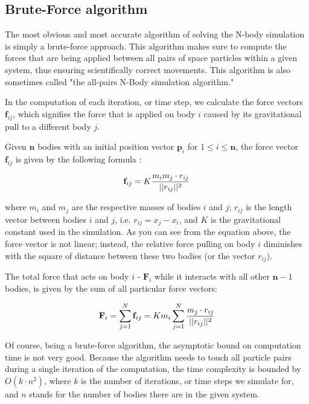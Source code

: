 \documentclass[journal]{IEEEtran}
\begin{document}
	\subsection*{Brute-Force algorithm}
		The most obvious and most accurate algorithm of solving the N-body simulation is simply a brute-force approach. This algorithm makes sure to compute the forces that are being applied between all pairs of space particles within a given system, thus ensuring scientifically correct movements. This algorithm is also sometimes called "the all-pairs N-Body simulation algorithm."
		
		In the computation of each iteration, or time step, we calculate the force vectors $\textbf{f}_{ij}$, which signifies the force that is applied on body $i$ caused by its gravitational pull to a different body $j$. 
		
		Given $\textbf{n}$ bodies with an initial position vector $\textbf{p}_{i}$ for 1$ \leq i \leq \textbf{n}$, the force vector $\textbf{f}_{ij}$ is given by the following formula \cite{nvidia-article}:
		
		\begin{equation}
		\centering
			\textbf{f}_{ij} = K \frac{m_i m_j \cdot r_{ij}}{||r_{ij}||^2} 
		\end{equation}
		
		where $m_i$ and $m_j$ are the respective masses of bodies $i$ and $j$; $r_{ij}$ is the length vector between bodies $i$ and $j$, i.e. $r_{ij} = x_j - x_i$, and $K$ is the gravitational constant used in the simulation. As you can see from the equation above, the force vector is not linear; instead, the relative force pulling on body $i$ diminishes with the square of distance between these two bodies (or the vector $r_{ij}$).
		
		The total force that acts on body $i$ - $\textbf{F}_i$ while it interacts with all other $\textbf{n}-1$ bodies, is given by the sum of all particular force vectors:
		
		\begin{equation}
		\centering
			\textbf{F}_i = \sum_{j = 1}^{N}\textbf{f}_{ij}
			 = K m_i \sum_{j = 1}^{N}{\frac{m_j \cdot r_{ij}}{||r_{ij}||^2}}
		\end{equation}
		
		Of course, being a brute-force algorithm, the asymptotic bound on computation time is not very good. Because the algorithm needs to touch all particle pairs during a single iteration of the computation, the time complexity is bounded by $O(k \cdot n^2)$, where $k$ is the number of iterations, or time steps we simulate for, and $n$ stands for the number of bodies there are in the given system.
	
\end{document}
